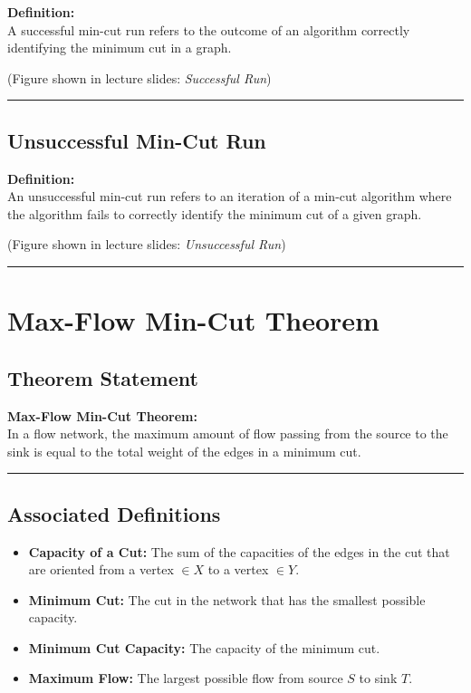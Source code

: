 \documentclass[12pt]{article}
\begin{document}
\textbf{Definition:} \\
A successful min-cut run refers to the outcome of an algorithm correctly identifying the minimum cut in a graph.

(Figure shown in lecture slides: \textit{Successful Run})

\hrule
\vspace{1em}

\subsection{Unsuccessful Min-Cut Run}

\textbf{Definition:} \\
An unsuccessful min-cut run refers to an iteration of a min-cut algorithm where the algorithm fails to correctly identify the minimum cut of a given graph.

(Figure shown in lecture slides: \textit{Unsuccessful Run})

\hrule
\vspace{1em}

\section{Max-Flow Min-Cut Theorem}

\subsection{Theorem Statement}

\textbf{Max-Flow Min-Cut Theorem:} \\
In a flow network, the maximum amount of flow passing from the source to the sink is equal to the total weight of the edges in a minimum cut.

\hrule
\vspace{1em}

\subsection{Associated Definitions}

\begin{itemize}
    \item \textbf{Capacity of a Cut:} The sum of the capacities of the edges in the cut that are oriented from a vertex \( \in X \) to a vertex \( \in Y \).
    \item \textbf{Minimum Cut:} The cut in the network that has the smallest possible capacity.
    \item \textbf{Minimum Cut Capacity:} The capacity of the minimum cut.
    \item \textbf{Maximum Flow:} The largest possible flow from source \( S \) to sink \( T \).
\end{itemize}
\end{document}
